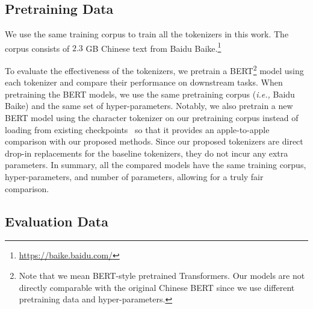 
\subsection{Pretraining Data}


We use the same training corpus to train all the tokenizers in this work. 
The corpus consists of $2.3$ GB Chinese text from Baidu Baike.\footnote{\url{https://baike.baidu.com/}}

To evaluate the effectiveness of the tokenizers, we pretrain a BERT\footnote{Note that we mean BERT-style pretrained Transformers. Our models are not directly comparable with the original Chinese BERT since we use different pretraining data and hyper-parameters.} model using each tokenizer and compare their performance on downstream tasks. 
%
When pretraining the BERT models, we use the same pretraining corpus (\textit{i.e., } Baidu Baike) and the same set of hyper-parameters.
%
Notably, we also pretrain a new BERT model using the character tokenizer on our pretraining corpus instead of loading from existing checkpoints~\cite{BERT} so that it provides an apple-to-apple comparison with our proposed methods.
%
Since our proposed tokenizers are direct drop-in replacements for the baseline tokenizers, they do not incur any extra parameters. 
%
In summary, all the compared models have the same training corpus, hyper-parameters, and number of parameters, allowing for a truly fair comparison.



\subsection{Evaluation Data}


